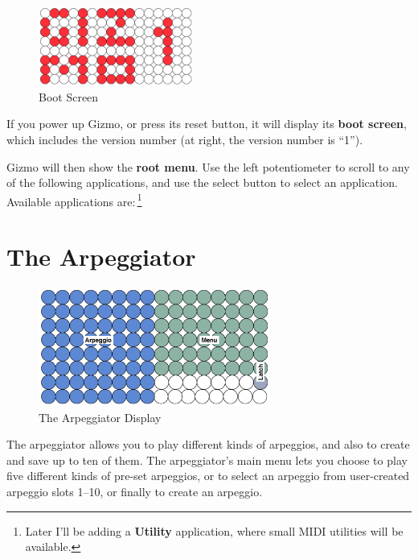 \documentclass{article}
\begin{document}
\begin{figure}
\vspace{-1.5em}\includegraphics[width=2in]{Gizmo1.pdf}
\vspace{-2em}\caption{\small Boot Screen}\vspace{-2em}
\label{BootScreen}
\end{figure}

If you power up Gizmo, or press its reset button, it will display its {\bf boot screen}, which includes the version number (at right, the version number is ``1'').

Gizmo will then show the {\bf root menu}.  Use the left potentiometer to scroll to any of the following applications, and use the select button to select an application.  Available applications are:\,\footnote{Later I'll be adding a {\bf Utility} application, where small MIDI utilities will be available.}

\section {The Arpeggiator}

\begin{figure}
\vspace{-1.5em}\includegraphics[width=3in]{arpeggio.pdf}
\vspace{-2em}\caption{\small The Arpeggiator Display}\vspace{-1em}
\label{arpeggiator}
\end{figure}

The arpeggiator allows you to play different kinds of arpeggios, and also to create and save up to ten of them.  The arpeggiator's main menu lets you choose to play five different kinds of pre-set arpeggios, or to select an arpeggio from user-created arpeggio slots 1--10, or finally to create an arpeggio.
\end{document}
